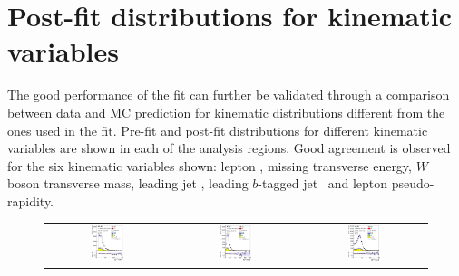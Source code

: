 \chapter{Post-fit distributions for kinematic variables}
\label{app:DataMC_validation_ttH}

The good performance of the fit can further be validated through a comparison between data and MC prediction for kinematic distributions different from the ones used in the fit. Pre-fit and post-fit distributions for different kinematic variables are shown in each of the analysis regions.
Good agreement is observed for the six kinematic variables shown: lepton \pt,  missing transverse energy, $W$ boson transverse mass, leading jet \pt, leading $b$-tagged jet \pt\ and lepton pseudo-rapidity.

\begin{figure}[tp]
  \centering
  \begin{tabular}{ccc}
  \includegraphics[width=0.27\textwidth]{Analysis/Figures_ttH/tesis_vars/prefit/lep_pt_4jetex2btagex.eps} &
  \includegraphics[width=0.27\textwidth]{Analysis/Figures_ttH/tesis_vars/prefit/met_4jetex2btagex.eps} &
  \includegraphics[width=0.27\textwidth]{Analysis/Figures_ttH/tesis_vars/prefit/WlepMT_4jetex2btagex.eps} \\

\end{tabular}
\end{figure}
